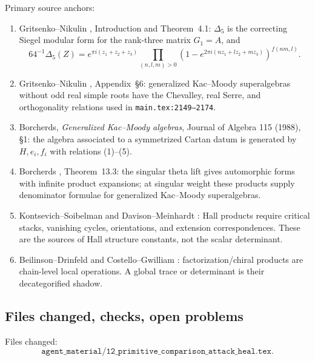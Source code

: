 Primary source anchors:
\begin{enumerate}
\item Gritsenko--Nikulin \cite{GN}, Introduction and Theorem~4.1:
\(\Delta_5\) is the correcting Siegel modular form for the rank-three
matrix \(G_1=A\), and
\[
64^{-1}\Delta_5(Z)
=e^{\pi i(z_1+z_2+z_3)}
\prod_{(n,l,m)>0}
\left(1-e^{2\pi i(nz_1+lz_2+mz_3)}\right)^{f(nm,l)}.
\]
\item Gritsenko--Nikulin \cite{GN}, Appendix~\S6: generalized
Kac--Moody superalgebras without odd real simple roots have the
Chevalley, real Serre, and orthogonality relations used in
\texttt{main.tex:2149--2174}.
\item Borcherds, \emph{Generalized Kac--Moody algebras}, Journal of
Algebra 115 (1988), \S1: the algebra associated to a symmetrized
Cartan datum is generated by \(H,e_i,f_i\) with relations (1)--(5).
\item Borcherds \cite{B}, Theorem~13.3: the singular theta lift gives
automorphic forms with infinite product expansions; at singular weight
these products supply denominator formulae for generalized Kac--Moody
superalgebras.
\item Kontsevich--Soibelman \cite{KSCoHA} and Davison--Meinhardt
\cite{DavisonMeinhardtCoHA}: Hall products require critical stacks,
vanishing cycles, orientations, and extension correspondences.  These
are the sources of Hall structure constants, not the scalar determinant.
\item Beilinson--Drinfeld \cite{BD} and Costello--Gwilliam
\cite{CostelloGwilliam1,CostelloGwilliam2}: factorization/chiral
products are chain-level local operations.  A global trace or determinant
is their decategorified shadow.
\end{enumerate}

\subsection{Files changed, checks, open problems}

Files changed:
\[
\texttt{agent\_material/12\_primitive\_comparison\_attack\_heal.tex}.
\]

